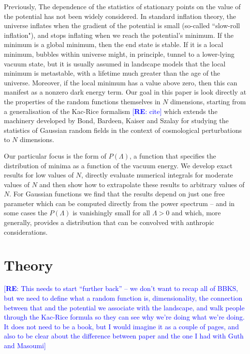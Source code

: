 \documentclass[12pt]{article}
\newcommand{\re}[1]{\textcolor{blue}{[{\bf RE}: #1]}}
\begin{document}
Previously, The dependence of the statistics of stationary points on the value of the potential has not been widely considered. In standard inflation theory, the universe inflates when the gradient of the potential is small (so-called ``slow-roll inflation"), and stops inflating when we reach the potential's minimum. If the minimum is a global minimum, then the end state is stable. If it is  a local minimum, bubbles within universe might, in principle,  tunnel to a lower-lying vacuum state, but it is usually assumed in landscape models that the local minimum is metastable, with a lifetime much greater than the age of the universe. Moreover, if the local minimum has a value above zero, then this can manifest as a nonzero dark energy term. Our goal in this paper is look directly at the properties of the random functions themselves in $N$ dimensions, starting from a generalisation of the Kac-Rice formalism \cite{Kac1943}\cite{Rice1945}\re{cite} which extends  the  machinery developed by Bond, Bardeen, Kaiser and Szalay for studying the statistics of Gaussian random fields in the context of cosmological perturbations to $N$ dimensions. 

Our particular focus is the form of $P(\Lambda)$, a function that specifies the distribution of minima as a function of the vacuum energy. We develop exact results for low values of $N$, directly evaluate numerical integrals for moderate values of $N$ and then show how to extrapolate these results to arbitrary values of $N$. For Gaussian functions we find that the results depend on just one free parameter which can be computed directly from the power spectrum -- and in some cases the $P(\Lambda)$ is vanishingly small for all  $\Lambda> 0$ and which, more generally, provides a distribution that can be convolved with anthropic considerations.  

\section{Theory}

\re{This needs to start ``further back'' -- we don't want to recap all of BBKS, but we need to define what a random function is, dimensionality, the connection between that  and the potential we associate with the landscape, and walk people through the Kac-Rice formula so they can see why we're doing what we're doing. It does not need to be a book, but I would imagine it as a couple of pages, and also to be clear about the difference between paper and the one I had with Guth and Masoumi}
\end{document}
